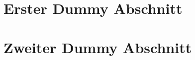 \documentclass[11pt, a4paper]{scrartcl}
\begin{document}
    \section*{Erster Dummy Abschnitt}
    \blindtext[4]
    \section*{Zweiter Dummy Abschnitt}
    \blindtext[4]
\end{document}

